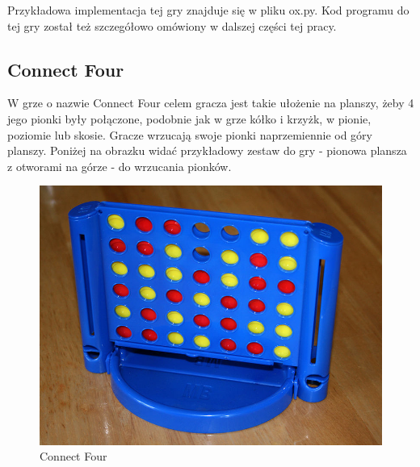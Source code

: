 \documentclass[polish,shortabstract,inz]{iithesis}
\begin{document}
Przykładowa implementacja tej gry znajduje się w pliku ox.py.
Kod programu do tej gry został też szczegółowo omówiony w dalszej części tej pracy.

\subsection{Connect Four}
W grze o nazwie Connect Four celem gracza jest takie ułożenie na planszy, żeby 4 jego pionki były połączone, podobnie jak w grze kółko i krzyżk, w pionie, poziomie lub skosie.
Gracze wrzucają swoje pionki naprzemiennie od góry planszy. Poniżej na obrazku widać przykładowy zestaw do gry - pionowa plansza z otworami na górze - do wrzucania pionków.
\begin{figure}[H]
  \includegraphics[scale=0.25]{./images/connect4.jpg}
  \centering
  \caption{Connect Four}
  \label{fig:c4}
\end{figure}
\end{document}
